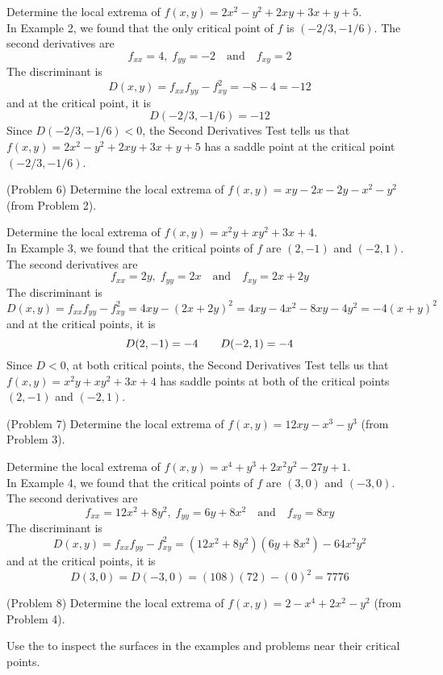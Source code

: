 \documentclass[handout]{ximera}
\begin{document}
\begin{example}[Example 6]
Determine the local extrema of $f(x,y) = 2x^2 - y^2 +2xy + 3x + y+ 5$.\\
In Example 2, we found that the only critical point of $f$ is $(-2/3,-1/6)$.
The second derivatives are
\[
f_{xx} = 4,\; f_{yy} = -2 \quad \text{and} \quad f_{xy} = 2
\]
The discriminant is
\[
D(x,y) = f_{xx} f_{yy} - f_{xy}^2 = -8 -4 = -12
\]
and at the critical point, it is
\[
D(-2/3,-1/6) = -12
\]
Since $D(-2/3,-1/6) < 0$, the Second Derivatives Test tells us that $f(x,y) = 2x^2 - y^2 +2xy + 3x + y+ 5$
has a saddle point at the critical point $(-2/3,-1/6)$.
\end{example}

\begin{problem}(Problem 6)
Determine the local extrema of $f(x,y) = xy - 2x-2y-x^2 - y^2$ (from Problem 2).\\
\end{problem}


\begin{example}[Example 7]
Determine the local extrema of  $f(x,y) = x^2y +xy^2 +3x + 4$.\\
In Example 3, we found that the critical points of $f$ are $(2,-1)$ and $(-2, 1)$.
The second derivatives are
\[
f_{xx} = 2y,\; f_{yy} = 2x \quad \text{and} \quad f_{xy} = 2x + 2y
\]
The discriminant is
\[
D(x,y) = f_{xx} f_{yy} - f_{xy}^2 = 4xy - (2x+2y)^2 = 4xy - 4x^2 - 8xy - 4y^2 = -4(x+y)^2
\]
and at the critical points, it is
\[
D(2, -1) = -4 \quad \text \quad D(-2, 1) = -4
\]
Since $D < 0$, at both critical points, the Second Derivatives Test tells us that $f(x,y) = x^2y +xy^2 +3x + 4$
has saddle points at both of the critical points $(2,-1)$ and $(-2, 1)$.
\end{example}


\begin{problem}(Problem 7)
Determine the local extrema of $f(x,y) = 12xy - x^3 - y^3$ (from Problem 3).\\
\end{problem}



\begin{example}[Example 8]
Determine the local extrema of $f(x,y) = x^4 + y^3 + 2x^2y^2 -27y + 1$.\\
In Example 4, we found that the critical points of $f$ are $(3,0)$ and $(-3,0)$.
The second derivatives are
\[
f_{xx} = 12x^2 + 8y^2,\; f_{yy} = 6y + 8x^2 \quad \text{and} \quad f_{xy} = 8xy
\]
The discriminant is
\[
D(x,y) = f_{xx} f_{yy} - f_{xy}^2 = (12x^2 + 8y^2)(6y + 8x^2) - 64x^2y^2
\]
and at the critical points, it is
\[
D(3, 0) = D(-3,0) = (108)(72) - (0)^2 = 7776
\]
\end{example}

\begin{problem}(Problem 8)
Determine the local extrema of $f(x,y) = 2-x^4 + 2x^2 - y^2$ (from Problem 4).\\
\end{problem}

Use the  to inspect
the surfaces in the examples and problems near their critical points.
\end{document}
